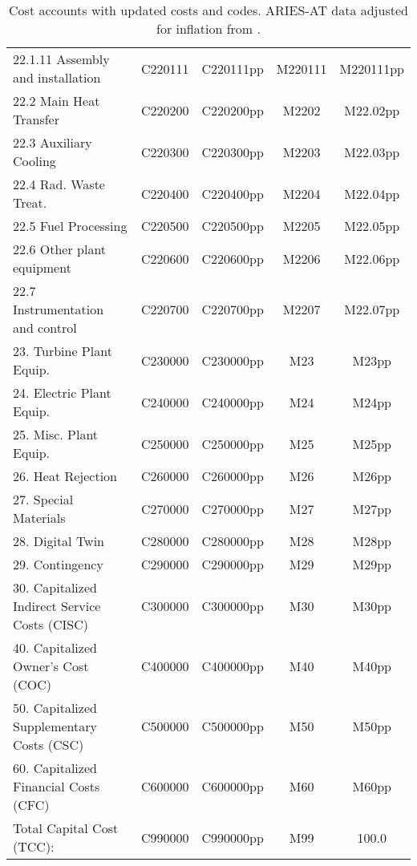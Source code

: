 \begin{table}[h!]
{\begin{tabular}{lcccc}
\hspace{15mm}22.1.11 Assembly and installation & C220111 & C220111pp & M220111 & M220111pp \\
\hspace{10mm}22.2 Main Heat Transfer & C220200 & C220200pp & M2202 & M22.02pp \\
\hspace{10mm}22.3 Auxiliary Cooling & C220300 & C220300pp & M2203 & M22.03pp \\
\hspace{10mm}22.4 Rad. Waste Treat. & C220400 & C220400pp & M2204 & M22.04pp \\
\hspace{10mm}22.5 Fuel Processing & C220500 & C220500pp & M2205 & M22.05pp \\
\hspace{10mm}22.6 Other plant equipment & C220600 & C220600pp & M2206 & M22.06pp \\
\hspace{10mm}22.7 Instrumentation and control & C220700 & C220700pp & M2207 & M22.07pp \\
\hspace{5mm}23. Turbine Plant Equip. & C230000 & C230000pp & M23 & M23pp \\
\hspace{5mm}24. Electric Plant Equip. & C240000 & C240000pp & M24 & M24pp \\
\hspace{5mm}25. Misc. Plant Equip. & C250000 & C250000pp & M25 & M25pp \\
\hspace{5mm}26. Heat Rejection & C260000 & C260000pp & M26 & M26pp \\
\hspace{5mm}27. Special Materials & C270000 & C270000pp & M27 & M27pp \\
\hspace{5mm}28. Digital Twin & C280000 & C280000pp & M28 & M28pp \\
\hspace{5mm}29. Contingency & C290000 & C290000pp & M29 & M29pp \\
30. Capitalized Indirect Service Costs (CISC) & C300000 & C300000pp & M30 & M30pp \\
40. Capitalized Owner’s Cost (COC) & C400000 & C400000pp & M40 & M40pp \\
50. Capitalized Supplementary Costs (CSC) & C500000 & C500000pp & M50 & M50pp \\
60. Capitalized Financial Costs (CFC) & C600000 & C600000pp & M60 & M60pp \\
\hline
Total Capital Cost (TCC): & C990000 & C990000pp & M99 & 100.0 \\
\hline
\end{tabular}
}
\caption{Cost accounts with updated costs and codes. ARIES-AT data adjusted for inflation from \cite{gordon1986mirror}.}
\label{tab:costs_updated_codes}
\end{table}


